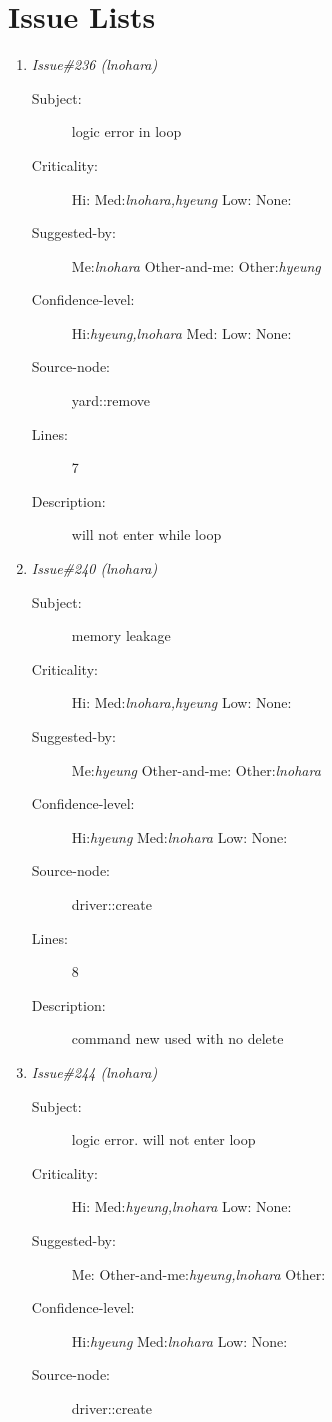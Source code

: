 \section{Issue Lists}
\begin{enumerate}
\item {\it Issue\#236 (lnohara)}
\begin{description}
\item [Subject:] logic error in loop
\item [Criticality:] Hi:{\it } Med:{\it lnohara,hyeung} Low:{\it } None:{\it }
\item [Suggested-by:] Me:{\it lnohara} Other-and-me:{\it } Other:{\it hyeung}
\item [Confidence-level:] Hi:{\it hyeung,lnohara} Med:{\it } Low:{\it } None:{\it }
\item [Source-node:] yard::remove

\item [Lines:] 7

\item [Description:] will not enter while loop
\end{description}
\item {\it Issue\#240 (lnohara)}
\begin{description}
\item [Subject:] memory leakage
\item [Criticality:] Hi:{\it } Med:{\it lnohara,hyeung} Low:{\it } None:{\it }
\item [Suggested-by:] Me:{\it hyeung} Other-and-me:{\it } Other:{\it lnohara}
\item [Confidence-level:] Hi:{\it hyeung} Med:{\it lnohara} Low:{\it } None:{\it }
\item [Source-node:] driver::create

\item [Lines:] 8

\item [Description:] command new used with no delete
\end{description}
\item {\it Issue\#244 (lnohara)}
\begin{description}
\item [Subject:] logic error. will not enter loop
\item [Criticality:] Hi:{\it } Med:{\it hyeung,lnohara} Low:{\it } None:{\it }
\item [Suggested-by:] Me:{\it } Other-and-me:{\it hyeung,lnohara} Other:{\it }
\item [Confidence-level:] Hi:{\it hyeung} Med:{\it lnohara} Low:{\it } None:{\it }
\item [Source-node:] driver::create


\end{description}
\end{enumerate}
